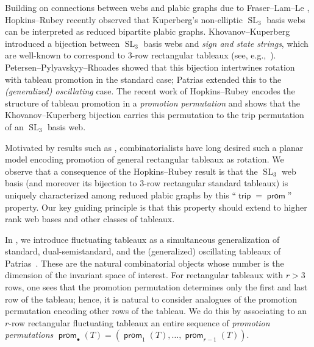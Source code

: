 \documentclass{amsart}
\theoremstyle{definition}
\theoremstyle{remark}
\numberwithin{equation}{section}
\DeclareMathOperator{\trip}{\mathsf{trip}}
\DeclareMathOperator{\prom}{\mathsf{prom}}
\DeclareMathOperator{\SL}{SL}
\begin{document}
Building on connections between webs and plabic graphs due to Fraser--Lam--Le \cite{Fraser-Lam-Le}, Hopkins--Rubey \cite{Hopkins-Rubey,Hopkins:talk} recently observed that Kuperberg's non-elliptic $\SL_3$ basis webs can be interpreted as reduced bipartite plabic graphs.
Khovanov--Kuperberg \cite{Khovanov-Kuperberg} introduced a bijection between $\SL_3$ basis webs and \emph{sign and state strings}, which are well-known to correspond to $3$-row rectangular tableaux (see, e.g.,~\cite{Petersen-Pylyavskyy-Rhoades,Patrias}). Petersen--Pylyavskyy--Rhoades \cite{Petersen-Pylyavskyy-Rhoades} showed that this bijection intertwines rotation with tableau promotion in the standard case; Patrias \cite{Patrias} extended this to the \emph{(generalized) oscillating} case. The recent work of Hopkins--Rubey \cite{Hopkins-Rubey,Hopkins:talk} 
encodes the structure of tableau promotion in a \emph{promotion permutation} and shows that the Khovanov--Kuperberg bijection carries this permutation to the trip permutation of an $\SL_3$ basis web. 

Motivated by results such as \cite{Rhoades}, combinatorialists have long desired such a planar model encoding promotion of general rectangular tableaux as rotation. 
We observe that a consequence of the Hopkins--Rubey result is that the $\SL_3$ web basis (and moreover its bijection to $3$-row rectangular standard tableaux) is uniquely characterized among reduced plabic graphs by this ``$\trip=\prom$'' property. Our key guiding principle is that this property should extend to higher rank web bases and other classes of tableaux.

In \cite{fluctuating-paper}, we
introduce fluctuating tableaux as a simultaneous generalization of standard, dual-semistandard, and the (generalized) oscillating tableaux of Patrias~\cite{Patrias}. These are the natural combinatorial objects whose number is the dimension of the invariant space of interest. For rectangular tableaux with $r>3$ rows, one sees that the promotion permutation determines only the first and last row of the tableau; hence, it is natural to consider analogues of the promotion permutation encoding other rows of the tableau. We do this by associating to an $r$-row rectangular fluctuating tableaux an entire sequence of \emph{promotion permutations} $\prom_\bullet(T) = (\prom_1(T), \ldots, \prom_{r-1}(T))$. 
\end{document}
